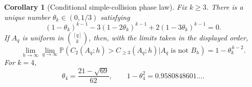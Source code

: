 \documentclass[11pt,reqno]{amsart}
\newtheorem{corollary}[theorem]{Corollary}
\theoremstyle{definition}
\theoremstyle{remark}
\begin{document}
\begin{corollary}[Conditional simple-collision phase law]
\label{cor:conditional-collision-phase}
Fix $k\geq3$.  There is a unique number
$\theta_k\in(0,1/3)$ satisfying
\begin{equation}\label{eq:collision-threshold}
 (1-\theta_k)^{k-1}
 -3(1-2\theta_k)^{k-1}
 +2(1-3\theta_k)^{k-1}=0.
\end{equation}
If $A_q$ is uniform in $\binom{[q]}k$, then, with the limits taken in
the displayed order,
\begin{equation}\label{eq:conditional-collision-phase}
 \boxed{\quad
 \lim_{h\to\infty}\lim_{q\to\infty}
 \mathbb P\left(
  C_2(A_q;h)>C_{\geq3}(A_q;h)
  \mathrel{\Big|} A_q\text{ is not }B_h
 \right)
 =1-\theta_k^{\,k-2}.
 \quad}
\end{equation}
For $k=4$,
\[
 \theta_4=\frac{21-\sqrt{69}}{62},
 \qquad
 1-\theta_4^2=0.9580848601\ldots.
\]
\end{corollary}
\end{document}
